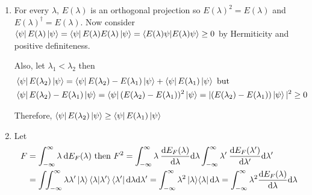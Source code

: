 \documentclass[12pt]{extarticle}
\begin{document}
\begin{enumerate}
\item For every $\lambda$, $E(\lambda)$ is an orthogonal projection so $E(\lambda)^2 = E(\lambda)$ and $E(\lambda)^\dagger = E(\lambda)$. Now consider $\left< \psi \right| E(\lambda) \left| \psi \right> = \left< \psi \right| E(\lambda) E(\lambda) \left| \psi \right> = \left< E(\lambda) \psi | E(\lambda) \psi \right> \ge 0$ by Hermiticity and positive definiteness. \smallskip

Also, let $\lambda_1 < \lambda_2$ then \begin{align*}
& \left< \psi \right| E(\lambda_2) \left| \psi \right>  = \left< \psi \right| E(\lambda_2) - E(\lambda_1) \left| \psi \right> + \left< \psi \right| E(\lambda_1) \left| \psi \right> \text{ but }  \\ & \left< \psi \right| E(\lambda_2) - E(\lambda_1) \left| \psi \right> = \left< \psi \right| (E(\lambda_2) - E(\lambda_1))^2 \left| \psi \right> = |(E(\lambda_2) - E(\lambda_1)) \left| \psi \right>|^2 \ge 0 
\end{align*}

Therefore,  $\left< \psi \right| E(\lambda_2) \left| \psi \right> \ge \left< \psi \right| E(\lambda_1) \left| \psi \right>$

\item Let 
\begin{align*}
F &= \int_{-\infty}^\infty \lambda \: \mathrm{d} E_F(\lambda) \text{ then } F^2 = \int_{-\infty}^\infty \lambda \: \frac{\mathrm{d} E_F(\lambda)}{\mathrm{d} \lambda} \mathrm{d} \lambda \int_{-\infty}^\infty \lambda' \: \frac{\mathrm{d} E_F(\lambda')}{\mathrm{d} \lambda'} \mathrm{d} \lambda' \\ &= \int \! \! \int_{-\infty}^{\infty} \lambda \lambda' \left| \lambda \right> \left< \lambda | \lambda' \right> \left< \lambda' \right| \mathrm{d} \lambda \mathrm{d} \lambda' =  \int_{-\infty}^{\infty} \lambda^2 \left| \lambda \right> \! \left< \lambda \right| \mathrm{d} \lambda = \int_{-\infty}^{\infty} \lambda^2 \frac{\mathrm{d} E_F(\lambda)}{\mathrm{d} \lambda} \mathrm{d} \lambda
\end{align*}


\end{enumerate}
\end{document}
